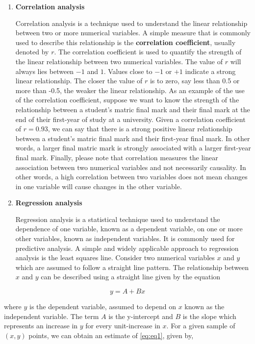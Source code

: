 \documentclass[
]{book}
\begin{document}
\begin{enumerate}
\def\labelenumi{\arabic{enumi}.}
\item
  \textbf{Correlation analysis}

  Correlation analysis is a technique used to understand the linear relationship between two or more numerical variables. A simple measure that is commonly used to describe this relationship is the \textbf{correlation coefficient}, usually denoted by \(r\). The correlation coefficient is used to quantify the strength of the linear relationship between two numerical variables. The value of \(r\) will always lies between \(-1\) and \(1\). Values close to \(-1\) or \(+1\) indicate a strong linear relationship. The closer the value of \(r\) is to zero, say less than 0.5 or more than -0.5, the weaker the linear relationship. As an example of the use of the correlation coefficient, suppose we want to know the strength of the relationship between a student's matric final mark and their final mark at the end of their first-year of study at a university. Given a correlation coefficient of \(r=0.93\), we can say that there is a strong positive linear relationship between a student's matric final mark and their first-year final mark. In other words, a larger final matric mark is strongly associated with a larger first-year final mark. Finally, please note that correlation measures the linear association between two numerical variables and not necessarily causality. In other words, a high correlation between two variables does not mean changes in one variable will cause changes in the other variable.
\item
  \textbf{Regression analysis}

  Regression analysis is a statistical technique used to understand the dependence of one variable, known as a dependent variable, on one or more other variables, known as independent variables. It is commonly used for predictive analysis. A simple and widely applicable approach to regression analysis is the least squares line. Consider two numerical variables \(x\) and \(y\) which are assumed to follow a straight line pattern. The relationship between \(x\) and \(y\) can be described using a straight line given by the equation
\end{enumerate}

\begin{equation}
y=A+Bx \label{eq:eq1}                                            
\end{equation}

where \(y\) is the dependent variable, assumed to depend on \(x\) known as the independent variable. The term \(A\) is the y-intercept and \(B\) is the slope which represents an increase in \(y\) for every unit-increase in \(x\). For a given sample of \((x,y)\) points, we can obtain an estimate of \eqref{eq:eq1}, given by,
\end{document}
